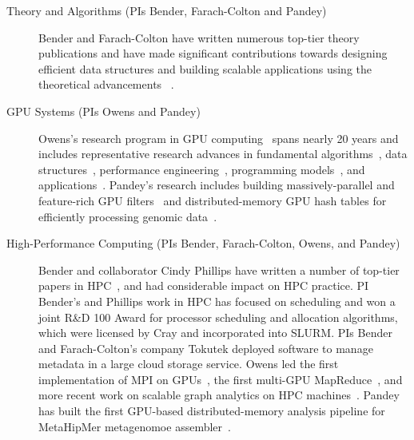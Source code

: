 \begin{description}
    \item[Theory and Algorithms (PIs Bender, Farach-Colton and Pandey)]
    Bender and Farach-Colton have written numerous top-tier theory publications and have made significant contributions towards designing efficient data structures and building scalable applications using the theoretical advancements   ~\cite{BenderFaGo18,BenderFaJo12,BenderFaJo12a,PandeyBJ17,PandeyABFJP18Cell,PandeyBJP17a,PandeyBJP17b,conway2018optimal,JannenYuZh15a,JannenYuZh15b,YuanZhJa16,pandey2021terrace,pandey2021variantstore,pandey2022iceberght}.
    
    \item[GPU Systems (PIs Owens and Pandey)] Owens's research program in GPU computing~\cite{Owens:2007:ASO,Owens:2008:GC} spans nearly 20 years and includes representative research advances in fundamental algorithms~\cite{Sengupta:2007:SPF}, data structures~\cite{Lefohn:2006:GGE,Alcantara:2009:RPH}, %
    performance engineering~\cite{Zhang:2011:AQP}, programming models~\cite{Gupta:2012:ASO, Tzeng:2010:TMF}, and applications~\cite{Wang:2017:GGG}. Pandey's research includes building massively-parallel and feature-rich GPU filters~\cite{mccoy2022high} and distributed-memory GPU hash tables for efficiently processing genomic data~\cite{nisa2021distributed}.
    
    \item[High-Performance Computing (PIs Bender, Farach-Colton, Owens, and
        Pandey)] Bender and collaborator Cindy Phillips have
      written a number of top-tier papers in HPC~\cite{PandeySMB20,bender2017two,eckstein2015pebbl,agrawal1989four,bender2008communication,greenberg1999enabling},
      and had considerable impact on HPC practice. 
      PI Bender’s and Phillips work in HPC has focused on scheduling and  won a joint R\&D 100 Award for processor scheduling and allocation algorithms, which were licensed by Cray and incorporated into SLURM\@.  PIs Bender and Farach-Colton's company Tokutek deployed software to manage metadata in a large cloud storage service. Owens led the first implementation of MPI on GPUs~\cite{Stuart:2009:MPO:withouturl,Stuart:2011:EMT}, the first multi-GPU MapReduce~\cite{Stuart:2011:MMO}, and more recent work on scalable graph analytics on HPC machines~\cite{Pan:2018:SBS,Pan:2017:MGA,Chen:2022:SIP}. Pandey has built the first GPU-based distributed-memory \kmer analysis pipeline for MetaHipMer metagenomoe assembler~\cite{nisa2021distributed}.
      

\end{description}
